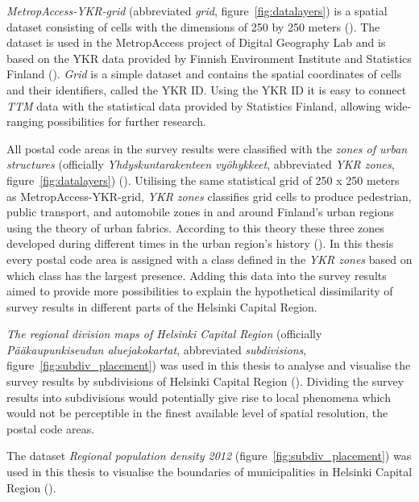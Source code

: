 \textit{MetropAccess-YKR-grid} (abbreviated \textit{grid}, figure~\ref{fig:datalayers}) is a spatial dataset consisting of cells with the dimensions of 250 by 250 meters (\cite{Toivonen2014a}). The dataset is used in the MetropAccess project of Digital Geography Lab and is based on the YKR data provided by Finnish Environment Institute and Statistics Finland (\cite{StatisticsFinland2020}). \textit{Grid} is a simple dataset and contains the spatial coordinates of cells and their identifiers, called the YKR ID. Using the YKR ID it is easy to connect \textit{TTM} data with the statistical data provided by Statistics Finland, allowing wide-ranging possibilities for further research.

All postal code areas in the survey results were classified with the \textit{zones of urban structures} (officially \textit{Yhdyskuntarakenteen vyöhykkeet}, abbreviated \textit{YKR zones}, figure~\ref{fig:datalayers}) (\cite{Ristimaki2017}). Utilising the same statistical grid of 250 x 250 meters as MetropAccess-YKR-grid, \textit{YKR zones} classifies grid cells to produce pedestrian, public transport, and automobile zones in and around Finland's urban regions using the theory of urban fabrics. According to this theory these three zones developed during different times in the urban region's history (\cite{Newman2016}). In this thesis every postal code area is assigned with a class defined in the \textit{YKR zones} based on which class has the largest presence. Adding this data into the survey results aimed to provide more possibilities to explain the hypothetical dissimilarity of survey results in different parts of the Helsinki Capital Region.

\textit{The regional division maps of Helsinki Capital Region} (officially \textit{Pääkaupunkiseudun aluejakokartat}, abbreviated \textit{subdivisions}, figure~\ref{fig:subdiv_placement}) was used in this thesis to analyse and visualise the survey results by subdivisions of Helsinki Capital Region (\cite{HelsinginEspoonVantaanjaKauniaistenmittausorganisaatiot2011}). Dividing the survey results into subdivisions would potentially give rise to local phenomena which would not be perceptible in the finest available level of spatial resolution, the postal code areas.

The dataset \textit{Regional population density 2012} (figure~\ref{fig:subdiv_placement}) was used in this thesis to visualise the boundaries of municipalities in Helsinki Capital Region (\cite{StatisticsFinland2012}). 

